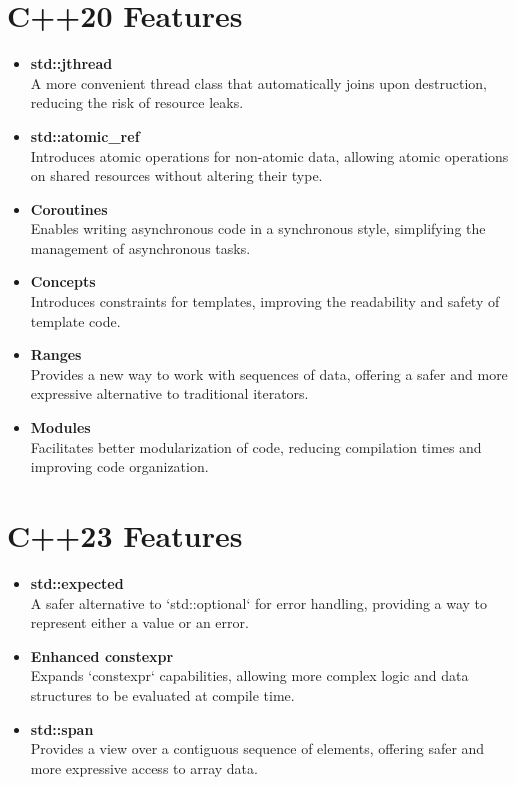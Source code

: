 \documentclass{article}
\begin{document}
\section*{C++20 Features}
\begin{itemize}
    \item \textbf{std::jthread} \\
    A more convenient thread class that automatically joins upon destruction, reducing the risk of resource leaks.
    
    \item \textbf{std::atomic\_ref} \\
    Introduces atomic operations for non-atomic data, allowing atomic operations on shared resources without altering their type.
    
    \item \textbf{Coroutines} \\
    Enables writing asynchronous code in a synchronous style, simplifying the management of asynchronous tasks.
    
    \item \textbf{Concepts} \\
    Introduces constraints for templates, improving the readability and safety of template code.
    
    \item \textbf{Ranges} \\
    Provides a new way to work with sequences of data, offering a safer and more expressive alternative to traditional iterators.
    
    \item \textbf{Modules} \\
    Facilitates better modularization of code, reducing compilation times and improving code organization.
\end{itemize}

\section*{C++23 Features}
\begin{itemize}
    \item \textbf{std::expected} \\
    A safer alternative to `std::optional` for error handling, providing a way to represent either a value or an error.
    
    \item \textbf{Enhanced constexpr} \\
    Expands `constexpr` capabilities, allowing more complex logic and data structures to be evaluated at compile time.
    
    \item \textbf{std::span} \\
    Provides a view over a contiguous sequence of elements, offering safer and more expressive access to array data.
\end{itemize}
\end{document}
